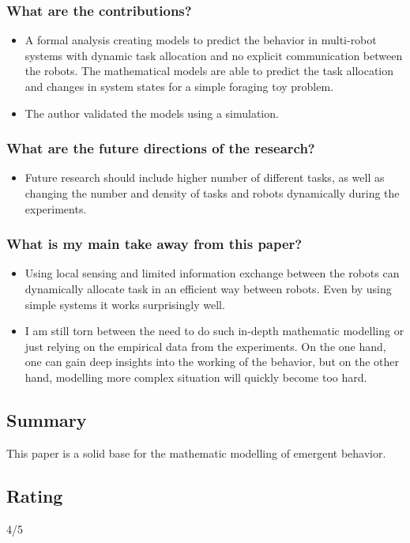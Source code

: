 \documentclass{article}
\begin{document}
\subsubsection*{What are the contributions?}
\begin{itemize}
    \item A formal analysis creating models to predict the behavior in multi-robot systems with dynamic task allocation and no explicit communication between the robots. The mathematical models are able to predict the task allocation and changes in system states for a simple foraging toy problem.
    \item The author validated the models using a simulation.
\end{itemize}
\subsubsection*{What are the future directions of the research?}
\begin{itemize}
    \item Future research should include higher number of different tasks, as well as changing the number and density of tasks and robots dynamically during the experiments.
\end{itemize}
\subsubsection*{What is my main take away from this paper?}
\begin{itemize}
    \item Using local sensing and limited  information exchange between the robots can dynamically allocate task in an efficient way between robots. Even by using simple systems it works surprisingly well.
    \item I am still torn between the need to do such in-depth mathematic modelling or just relying on the empirical data from the experiments. On the one hand, one can gain deep insights into the working of the behavior, but on the other hand, modelling more complex situation will quickly become too hard.
\end{itemize}

\subsection*{Summary}
This paper is a solid base for the mathematic modelling of emergent behavior.  
\subsection*{Rating}
4/5
\end{document}
